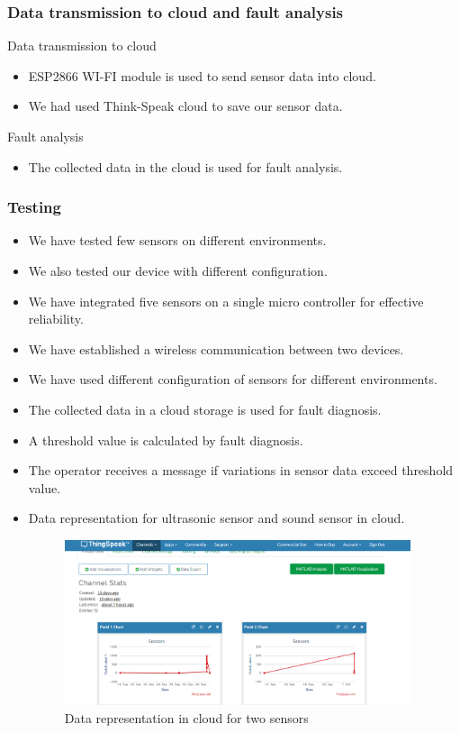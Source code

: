 \documentclass{beamer}
\begin{document}
\begin{frame}\frametitle{Data transmission to cloud and fault analysis}
\item Data transmission to cloud
\begin{itemize}
\item ESP2866 WI-FI module is used to send sensor data into cloud.
\item We had used Think-Speak cloud to save our sensor data.  
\end{itemize}
\item Fault analysis
\begin{itemize}
\item The collected data in the cloud is used for fault analysis.
\end{itemize}
\end{frame}
\begin{frame}\frametitle{Testing}
\begin{itemize}
\item We have tested few sensors on different environments.
\item We also tested our device with different configuration.  
\end{itemize}
\end{frame}
\begin{frame}
\begin{itemize}\frametitle{Results}
\item We have integrated five sensors on a single micro controller for effective reliability. 
\item We have established a wireless communication between two devices.
\item We have used different configuration of sensors for different environments.
\item The collected data in a cloud storage is used for fault diagnosis.
\item A threshold value is calculated by fault diagnosis.
\item The operator receives a message if variations in sensor data exceed threshold value. 
\end{itemize} 
\end{frame}
\begin{frame}
\begin{itemize}
\item Data representation for ultrasonic sensor and sound sensor in cloud.
  \begin{figure}[H]
  \centerline{\includegraphics[width=4.0in]{01.JPG}}
  \caption{ \textbf{}Data representation in cloud for two sensors}
  \end{figure}
\end{itemize}
\end{frame}
\end{document}
